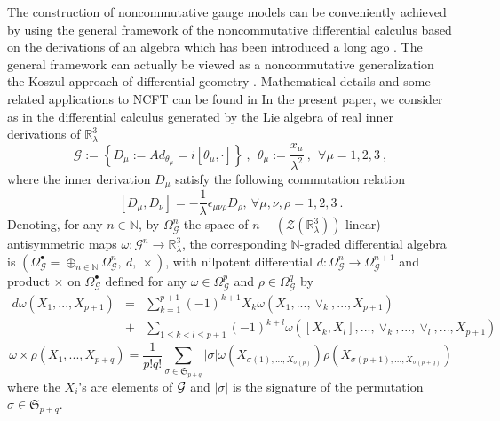 \documentclass[10pt]{book}
\theoremstyle{break}
\begin{document}
The construction of noncommutative gauge models can be conveniently achieved by using the general framework of the noncommutative differential calculus based on the derivations of an algebra which has been introduced a long ago %
. The general framework can actually be viewed as a noncommutative generalization the Koszul approach of differential geometry %
. Mathematical details and some related applications to NCFT can be found in %
In the present paper, we consider as in %
the differential calculus generated by the Lie algebra of real inner derivations of $\mathbb{R}^3_\lambda$%
%
\begin{equation}
\mathcal{G} := \left\{D_\mu:= Ad_{\theta_\mu}= i \left[\theta_\mu, \cdot\right]\right\} \ ,  \ \ \theta_\mu := \frac{x_\mu}{\lambda^2} \ , \ \ \forall \mu = 1,2,3 \ , %
\end{equation}
%
where the inner derivation $D_\mu$ satisfy the following commutation relation%
%
\begin{equation}
\left[D_\mu,D_\nu\right] = -\frac{1}{\lambda} \epsilon_{\mu\nu\rho} D_\rho,\ \forall \mu,\nu,\rho = 1,2,3 \ . %
\end{equation}
%
Denoting, for any $n\in\mathbb{N}$, by $\Omega^n_\mathcal{G}$ the space of $n-(\mathcal{Z}(\mathbb{R}^3_\lambda))$-linear) antisymmetric maps $\omega:\mathcal{G}^n\to\mathbb{R}^3_\lambda$, the corresponding $\mathbb{N}$-graded differential algebra is $(\Omega_\mathcal{G}^\bullet = \oplus_{n\in\mathbb{N}} \Omega^n_\mathcal{G},\ d,\ \times)$, with nilpotent differential $d:\Omega^n_\mathcal{G}\to\Omega^{n+1}_\mathcal{G}$ and product $\times$ on $\Omega_\mathcal{G}^\bullet$ defined for any $\omega\in\Omega^p_\mathcal{G}$ and $\rho\in\Omega^q_\mathcal{G}$ by
\begin{eqnarray}
d\omega(X_1,...,X_{p+1})&=&\sum_{k=1}^{p+1}(-1)^{k+1}X_k\omega(X_1,...,\vee_k,...,X_{p+1})\nonumber\\
&+&\sum_{1\le k<l\le p+1}(-1)^{k+l}\omega([X_k,X_l],...,\vee_k,...,\vee_l,...,X_{p+1})%
\end{eqnarray}
%
\begin{equation}
\omega\times\rho(X_1,...,X_{p+q})=\frac{1}{p!q!}\sum_{\sigma\in\mathfrak{S}_{p+q}}\vert\sigma\vert\omega(X_{\sigma(1),...,X_{\sigma(p)}})
\rho(X_{\sigma(p+1),...,X_{\sigma(p+q)}})%
\end{equation}
%
where the $X_i$'s are elements of ${\cal{G}}$ and $\vert\sigma\vert$ is the signature of the permutation $\sigma\in\mathfrak{S}_{p+q}$.\par 
\end{document}
